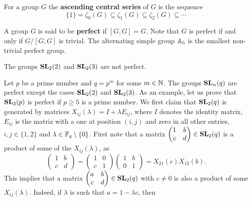 For a group $G$ the \textbf{ascending central series} of $G$ is the sequence 
\[
	\{1\}=\zeta_0(G)\subseteq\zeta_1(G)\subseteq\zeta_2(G)\subseteq\cdots
\]

A group $G$ is said to be \textbf{perfect} if $[G,G]=G$. Note that
$G$ is perfect if and only if $G/[G,G]$ is trivial. The alternating 
simple group $\mathbb{A}_5$ is the smallest non-trivial perfect group. 

\begin{example}
The groups $\mathbf{SL}_2(2)$ and $\mathbf{SL}_2(3)$ are not perfect. 	
\end{example}

Let $p$ be a prime number and $q=p^m$ for some $m\in\mathbb{N}$.  
The groups $\mathbf{SL}_n(q)$ are perfect except the cases $\mathbf{SL}_2(2)$ and $\mathbf{SL}_2(3)$. As an example,
let us prove that $\mathbf{SL}_2(p)$ is perfect if $p\geq5$ is a prime number. We first 
claim that $\mathbf{SL}_2(q)$ is generated by matrices
$X_{ij}(\lambda)=I+\lambda E_{ij}$, where $I$ denotes the identity matrix, 
$E_{ij}$ is the matriz with a one at position $(i,j)$ and zero in all other entries, 
$i,j\in\{1,2\}$ and $\lambda\in\mathbb{F}_q\setminus\{0\}$. First note that
a matrix $\begin{pmatrix}1&b\\c&d\end{pmatrix}\in\mathbf{SL}_2(q)$ is 
a product of some of the $X_{ij}(\lambda)$, as 
\[
\begin{pmatrix}
1&b\\
c&d	
\end{pmatrix}
=\begin{pmatrix}
1&0\\
c&1
\end{pmatrix}
\begin{pmatrix}
1&b\\
0&1	
\end{pmatrix}
=X_{21}(c)X_{12}(b).
\]
This implies that a matrix $\begin{pmatrix}a&b\\c&d\end{pmatrix}\in\mathbf{SL}_2(q)$ 
with $c\ne 0$ is also a product
of some $X_{ij}(\lambda)$. Indeed, if
$\lambda$ is such that $a=1-\lambda c$, then
